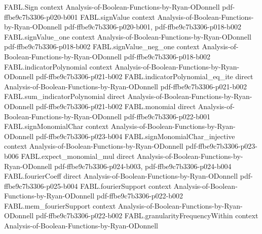 \begin{theorem}
\label{FABL.averageInfluence_mul_one_sub_exp_neg_two_div_two_le_noiseSensitivity}
\leanok
{}
\proofstep
  {FABL.Sign}
  {context}
  {Analysis-of-Boolean-Functions-by-Ryan-ODonnell}
  {pdf-ffbe9c7b3306-p020-b001}
\proofstep
  {FABL.signValue}
  {context}
  {Analysis-of-Boolean-Functions-by-Ryan-ODonnell}
  {pdf-ffbe9c7b3306-p020-b001,
    pdf-ffbe9c7b3306-p018-b002}
\proofstep
  {FABL.signValue_one}
  {context}
  {Analysis-of-Boolean-Functions-by-Ryan-ODonnell}
  {pdf-ffbe9c7b3306-p018-b002}
\proofstep
  {FABL.signValue_neg_one}
  {context}
  {Analysis-of-Boolean-Functions-by-Ryan-ODonnell}
  {pdf-ffbe9c7b3306-p018-b002}
\proofstep
  {FABL.indicatorPolynomial}
  {context}
  {Analysis-of-Boolean-Functions-by-Ryan-ODonnell}
  {pdf-ffbe9c7b3306-p021-b002}
\proofstep
  {FABL.indicatorPolynomial_eq_ite}
  {direct}
  {Analysis-of-Boolean-Functions-by-Ryan-ODonnell}
  {pdf-ffbe9c7b3306-p021-b002}
\proofstep
  {FABL.sum_indicatorPolynomial}
  {direct}
  {Analysis-of-Boolean-Functions-by-Ryan-ODonnell}
  {pdf-ffbe9c7b3306-p021-b002}
\proofstep
  {FABL.monomial}
  {direct}
  {Analysis-of-Boolean-Functions-by-Ryan-ODonnell}
  {pdf-ffbe9c7b3306-p022-b001}
\proofstep
  {FABL.signMonomialChar}
  {context}
  {Analysis-of-Boolean-Functions-by-Ryan-ODonnell}
  {pdf-ffbe9c7b3306-p023-b004}
\proofstep
  {FABL.signMonomialChar_injective}
  {context}
  {Analysis-of-Boolean-Functions-by-Ryan-ODonnell}
  {pdf-ffbe9c7b3306-p023-b006}
\proofstep
  {FABL.expect_monomial_mul}
  {direct}
  {Analysis-of-Boolean-Functions-by-Ryan-ODonnell}
  {pdf-ffbe9c7b3306-p024-b003,
    pdf-ffbe9c7b3306-p024-b004}
\proofstep
  {FABL.fourierCoeff}
  {direct}
  {Analysis-of-Boolean-Functions-by-Ryan-ODonnell}
  {pdf-ffbe9c7b3306-p025-b004}
\proofstep
  {FABL.fourierSupport}
  {context}
  {Analysis-of-Boolean-Functions-by-Ryan-ODonnell}
  {pdf-ffbe9c7b3306-p022-b002}
\proofstep
  {FABL.mem_fourierSupport}
  {context}
  {Analysis-of-Boolean-Functions-by-Ryan-ODonnell}
  {pdf-ffbe9c7b3306-p022-b002}
\proofstep
  {FABL.granularityFrequencyWithin}
  {context}
  {Analysis-of-Boolean-Functions-by-Ryan-ODonnell}

\end{theorem}
